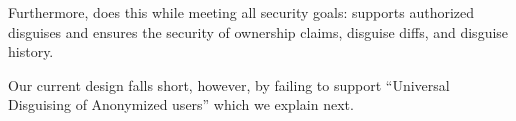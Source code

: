 Furthermore, \sys does this while meeting all security goals: \sys supports authorized disguises and
ensures the security of ownership claims, disguise diffs, and disguise history.

Our current design falls short, however, by failing to support ``Universal Disguising of Anonymized
users'' which we explain next.




